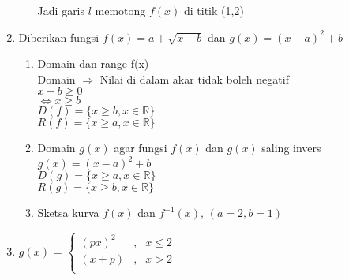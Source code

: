 \documentclass[12pt, a4paper]{article}
\begin{document}
\begin{enumerate}
\begin{enumerate}
        Jadi garis $l$ memotong $f(x)$ di titik (1,2) 
    \end{enumerate}
    \item Diberikan fungsi $f(x) = a + \sqrt{x-b}$ dan $g(x) = (x-a)^2 + b$ \\
    \begin{enumerate}
        \item Domain dan range f(x) \\
        Domain $\Rightarrow$ Nilai di dalam akar tidak boleh negatif \\
        $x-b \geq 0$ \\
        $\Leftrightarrow x \geq b$ \\
        $D(f) = \{x \geq b, x \in \mathbb{R}\}$ \\
        $R(f) = \{x \geq a, x \in \mathbb{R}\}$ 
        \item Domain $g(x)$ agar fungsi $f(x)$ dan $g(x)$ saling invers \\
        $g(x) = (x-a)^2 + b$ \\
        $D(g) = \{x \geq a, x \in \mathbb{R}\}$ \\
        $R(g) = \{x \geq b, x \in \mathbb{R}\}$ 
        \item Sketsa kurva $f(x)$ dan $f^{-1}(x)$, $(a = 2, b = 1)$ \\
    \end{enumerate}
    \item $g(x)$ =  $\left\{ \begin{array}{rcl}
        (px)^2 & \mbox{,} & x \leq 2 \\ 
        (x+p) & \mbox{,} & x > 2 \\
        \end{array}\right.$ \\

\end{enumerate}
\end{document}
